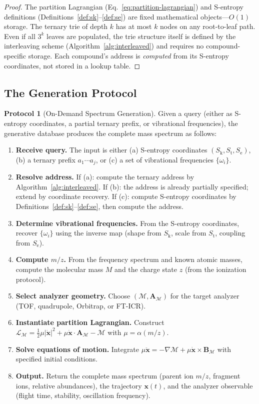 \documentclass[11pt,twocolumn,a4paper]{article}
\theoremstyle{definition}
\newtheorem{protocol}[theorem]{Protocol}
\theoremstyle{remark}
\newcommand{\Sk}{S_{\mathrm{k}}}
\newcommand{\St}{S_{\mathrm{t}}}
\newcommand{\Se}{S_{\mathrm{e}}}
\newcommand{\Depth}{\mathcal{M}}
\newcommand{\partinert}{\mu}
\newcommand{\Apartition}{\mathbf{A}_{\mathcal{M}}}
\newcommand{\Lagr}{\mathcal{L}}
\begin{document}
\begin{proof}
The partition Lagrangian (Eq.~\ref{eq:partition-lagrangian}) and S-entropy definitions (Definitions~\ref{def:sk}--\ref{def:se}) are fixed mathematical objects---$O(1)$ storage. The ternary trie of depth $k$ has at most $k$ nodes on any root-to-leaf path. Even if all $3^k$ leaves are populated, the trie structure itself is defined by the interleaving scheme (Algorithm~\ref{alg:interleaved}) and requires no compound-specific storage. Each compound's address is \emph{computed} from its S-entropy coordinates, not stored in a lookup table.
\end{proof}

\subsection{The Generation Protocol}
\label{sec:generation-protocol}

\begin{protocol}[On-Demand Spectrum Generation]
\label{prot:generation}
Given a query (either as S-entropy coordinates, a partial ternary prefix, or vibrational frequencies), the generative database produces the complete mass spectrum as follows:
\begin{enumerate}
  \item \textbf{Receive query.} The input is either (a) S-entropy coordinates $(\Sk, \St, \Se)$, (b) a ternary prefix $a_1 \cdots a_j$, or (c) a set of vibrational frequencies $\{\omega_i\}$.
  \item \textbf{Resolve address.} If (a): compute the ternary address by Algorithm~\ref{alg:interleaved}. If (b): the address is already partially specified; extend by coordinate recovery. If (c): compute S-entropy coordinates by Definitions~\ref{def:sk}--\ref{def:se}, then compute the address.
  \item \textbf{Determine vibrational frequencies.} From the S-entropy coordinates, recover $\{\omega_i\}$ using the inverse map (shape from $\Sk$, scale from $\St$, coupling from $\Se$).
  \item \textbf{Compute $m/z$.} From the frequency spectrum and known atomic masses, compute the molecular mass $M$ and the charge state $z$ (from the ionization protocol).
  \item \textbf{Select analyzer geometry.} Choose $(\Depth, \Apartition)$ for the target analyzer (TOF, quadrupole, Orbitrap, or FT-ICR).
  \item \textbf{Instantiate partition Lagrangian.} Construct $\Lagr_\Depth = \tfrac{1}{2}\partinert|\dot{\mathbf{x}}|^2 + \partinert\dot{\mathbf{x}} \cdot \Apartition - \Depth$ with $\partinert = \alpha(m/z)$.
  \item \textbf{Solve equations of motion.} Integrate $\partinert\ddot{\mathbf{x}} = -\nabla\Depth + \partinert\dot{\mathbf{x}} \times \mathbf{B}_\Depth$ with specified initial conditions.
  \item \textbf{Output.} Return the complete mass spectrum (parent ion $m/z$, fragment ions, relative abundances), the trajectory $\mathbf{x}(t)$, and the analyzer observable (flight time, stability, oscillation frequency).
\end{enumerate}
\end{protocol}
\end{document}
